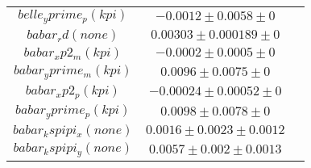 \begin{table}[htdp]
\begin{center}
\begin{tabular}{|c|c|c|}
$belle_yprime_p(kpi)$ & $-0.0012\pm0.0058\pm0$ & \\
$babar_rd(none)$ & $0.00303\pm0.000189\pm0$ & \\
$babar_xp2_m(kpi)$ & $-0.0002\pm0.0005\pm0$ & \\
$babar_yprime_m(kpi)$ & $0.0096\pm0.0075\pm0$ & \\
$babar_xp2_p(kpi)$ & $-0.00024\pm0.00052\pm0$ & \\
$babar_yprime_p(kpi)$ & $0.0098\pm0.0078\pm0$ & \\
$babar_kspipi_x(none)$ & $0.0016\pm0.0023\pm0.0012$ & \\
$babar_kspipi_y(none)$ & $0.0057\pm0.002\pm0.0013$ & \\
\hline
\end{tabular}
\end{center}
\label{table:input/nodcpv/nodcpv_nocdf_hfag_agamma_inputs}
\end{table}
